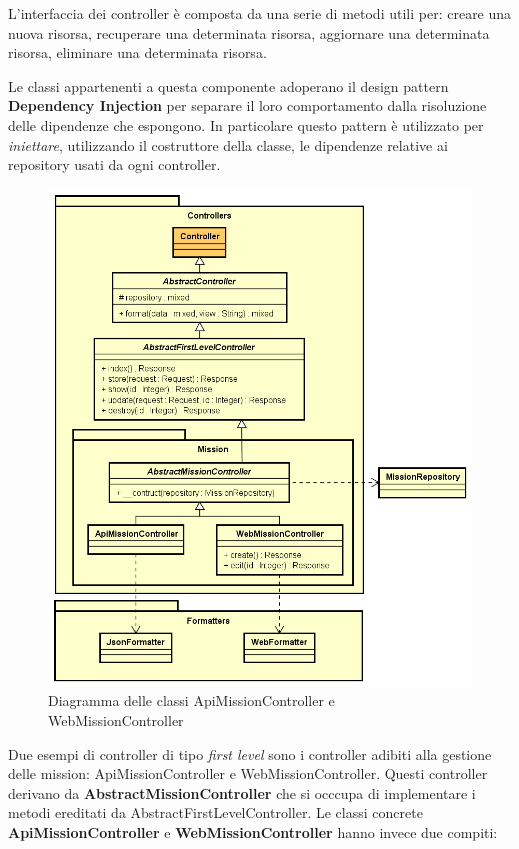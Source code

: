 L'interfaccia dei controller è composta da una serie di metodi utili per: creare una nuova risorsa, recuperare una determinata risorsa, aggiornare una determinata risorsa, eliminare una determinata risorsa. \bigskip

Le classi appartenenti a questa componente adoperano il design pattern \textbf{Dependency Injection} per separare il loro comportamento dalla risoluzione delle dipendenze che espongono. In particolare questo pattern è utilizzato per \textit{iniettare}, utilizzando il costruttore della classe, le dipendenze relative ai repository usati da ogni controller.

\begin{figure}[H]
	\centering
  \includegraphics[scale=0.5, width=\textwidth]{immagini/components/controllers_example.png}
  \caption{Diagramma delle classi ApiMissionController e WebMissionController}
	\label{fig:controller-example} 
\end{figure}
 
Due esempi di controller di tipo \textit{first level} sono i controller adibiti alla gestione delle mission: ApiMissionController e WebMissionController. Questi controller derivano da \textbf{AbstractMissionController} che si occcupa di implementare i metodi ereditati da AbstractFirstLevelController. Le classi concrete \textbf{ApiMissionController} e \textbf{WebMissionController} hanno invece due compiti: 

